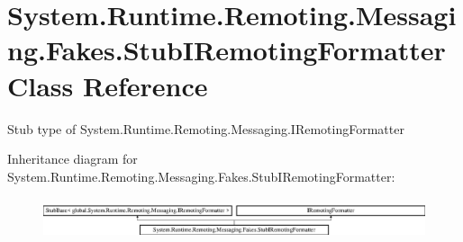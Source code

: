 \hypertarget{class_system_1_1_runtime_1_1_remoting_1_1_messaging_1_1_fakes_1_1_stub_i_remoting_formatter}{\section{System.\-Runtime.\-Remoting.\-Messaging.\-Fakes.\-Stub\-I\-Remoting\-Formatter Class Reference}
\label{class_system_1_1_runtime_1_1_remoting_1_1_messaging_1_1_fakes_1_1_stub_i_remoting_formatter}
}


Stub type of System.\-Runtime.\-Remoting.\-Messaging.\-I\-Remoting\-Formatter 


Inheritance diagram for System.\-Runtime.\-Remoting.\-Messaging.\-Fakes.\-Stub\-I\-Remoting\-Formatter\-:\begin{figure}[H]
\begin{center}
\leavevmode
\includegraphics[height=1.230769cm]{class_system_1_1_runtime_1_1_remoting_1_1_messaging_1_1_fakes_1_1_stub_i_remoting_formatter}
\end{center}
\end{figure}
